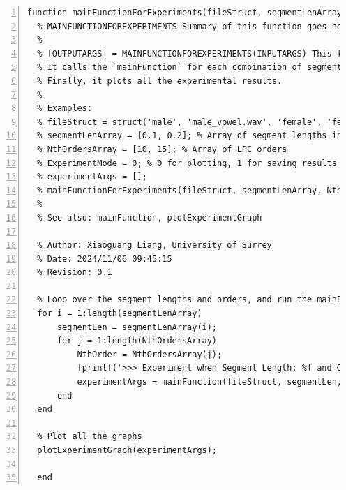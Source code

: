 \documentclass{article}
\begin{document}
\begin{lstlisting}[frame=single, numbers=left, style=Matlab-editor, caption={mainFunctionForExperiments.m}, label={lst:mainFunctionForExperiments}]
  function mainFunctionForExperiments(fileStruct, segmentLenArray, NthOrdersArray, ExperimentMode, experimentArgs)
  % MAINFUNCTIONFOREXPERIMENTS Summary of this function goes here
  %
  % [OUTPUTARGS] = MAINFUNCTIONFOREXPERIMENTS(INPUTARGS) This function runs multiple experiments by looping over different segment lengths and LPC orders.
  % It calls the `mainFunction` for each combination of segment length and LPC order, and collects the results.
  % Finally, it plots all the experimental results.
  %
  % Examples:
  % fileStruct = struct('male', 'male_vowel.wav', 'female', 'female_vowel.wav');
  % segmentLenArray = [0.1, 0.2]; % Array of segment lengths in seconds
  % NthOrdersArray = [10, 15]; % Array of LPC orders
  % ExperimentMode = 0; % 0 for plotting, 1 for saving results
  % experimentArgs = [];
  % mainFunctionForExperiments(fileStruct, segmentLenArray, NthOrdersArray, ExperimentMode, experimentArgs);
  %
  % See also: mainFunction, plotExperimentGraph
  
  % Author: Xiaoguang Liang, University of Surrey
  % Date: 2024/11/06 09:45:15
  % Revision: 0.1
  
  % Loop over the segment lengths and orders, and run the mainFunction to plot graphs and generate the synthesis audios
  for i = 1:length(segmentLenArray)
      segmentLen = segmentLenArray(i);
      for j = 1:length(NthOrdersArray)
          NthOrder = NthOrdersArray(j);
          fprintf('>>> Experiment when Segment Length: %f and Order: %d\n', segmentLen, NthOrder);
          experimentArgs = mainFunction(fileStruct, segmentLen, NthOrder, ExperimentMode, experimentArgs);
      end
  end
  
  % Plot all the graphs
  plotExperimentGraph(experimentArgs);
  
  end

\end{lstlisting}
\end{document}
